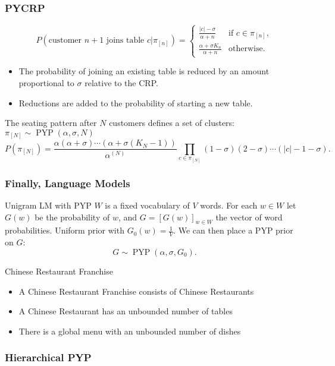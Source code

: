 \documentclass{beamer}
\begin{document}
\begin{frame}
    \frametitle{PYCRP}

    \[
        P(\text{customer }n+1\text{ joins table }c|\pi_{[n]}) = 
          \begin{cases}
           \frac{|c|-\sigma}{\alpha+n} & \text{if } c \in \pi_{[n]}, \\
           \frac{\alpha+\sigma K_n}{\alpha+n}       & \text{otherwise.}
          \end{cases}
    \]
    \begin{itemize}
        \item The probability of joining an existing table is reduced by an amount proportional to $\sigma$ relative to the CRP.
        \item Reductions are added to the probability of starting a new table.
    \end{itemize}

    The seating pattern after $N$ customers defines a set of clusters: $\pi_{[N]}\sim\operatorname{PYP}(\alpha,\sigma,N)$
    \[
        P(\pi_{[N]}) = \frac{\alpha(\alpha+\sigma)\cdots(\alpha+\sigma(K_N-1))}{\alpha^{(N)}}\prod_{c\in\pi_{[N]}}(1-\sigma)(2-\sigma)\cdots(|c|-1-\sigma).
    \]

\end{frame}

\begin{frame}
    \frametitle{Finally, Language Models}

    \begin{block}{Unigram LM with PYP}
        $W$ is a fixed vocabulary of $V$ words. For each $w\in W$ let $G(w)$ be the probability of $w$, and $G=[G(w)]_{w\in W}$ the vector of word probabilities. Uniform prior with $G_0(w) = \frac{1}{V}$.
We can then place a PYP prior on $G$: \[ G \sim \operatorname{PYP}(\alpha, \sigma, G_0). \] 
    \end{block}

    \begin{block}{Chinese Restaurant Franchise}
        \begin{itemize}
            \item A Chinese Restaurant Franchise consists of Chinese Restaurants
            \item A Chinese Restaurant has an unbounded number of tables
            \item There is a global menu with an unbounded number of dishes
        \end{itemize}
    \end{block}
\end{frame}

\begin{frame}
    \frametitle{Hierarchical PYP}
\end{frame}
\end{document}
